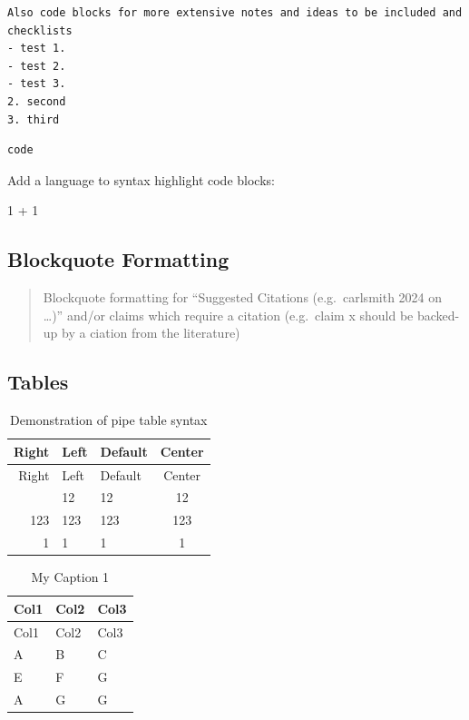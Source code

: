 \documentclass[
  11pt,
  letterpaper,
]{book}
\newenvironment{Shaded}{\begin{snugshade}}{\end{snugshade}}
\newcommand{\DecValTok}[1]{\textcolor[rgb]{0.68,0.00,0.00}{#1}}
\newcommand{\OperatorTok}[1]{\textcolor[rgb]{0.37,0.37,0.37}{#1}}
\begin{document}
\begin{verbatim}
Also code blocks for more extensive notes and ideas to be included and checklists
- test 1. 
- test 2. 
- test 3.
2. second
3. third
\end{verbatim}

\begin{verbatim}
code
\end{verbatim}

Add a language to syntax highlight code blocks:

\begin{Shaded}
\begin{Highlighting}[]
\DecValTok{1} \OperatorTok{+} \DecValTok{1}
\end{Highlighting}
\end{Shaded}

\subsection*{Blockquote Formatting}\label{blockquote-formatting}

\begin{quote}
Blockquote formatting for ``Suggested Citations (e.g.~carlsmith 2024 on
\ldots)'' and/or claims which require a citation (e.g.~claim x should be
backed-up by a ciation from the literature)
\end{quote}

\subsection*{Tables}\label{tables}

\begin{longtable}[]{@{}rllc@{}}
\caption{Demonstration of pipe table
syntax}\label{tbl-letters}\tabularnewline
\toprule\noalign{}
Right & Left & Default & Center \\
\midrule\noalign{}
\endfirsthead
\toprule\noalign{}
Right & Left & Default & Center \\
\midrule\noalign{}
\endhead
\bottomrule\noalign{}
\endlastfoot
12 & 12 & 12 & 12 \\
123 & 123 & 123 & 123 \\
1 & 1 & 1 & 1 \\
\end{longtable}

\begin{longtable}[]{@{}lll@{}}
\caption{My Caption 1}\label{tbl-letters}\tabularnewline
\toprule\noalign{}
Col1 & Col2 & Col3 \\
\midrule\noalign{}
\endfirsthead
\toprule\noalign{}
Col1 & Col2 & Col3 \\
\midrule\noalign{}
\endhead
\bottomrule\noalign{}
\endlastfoot
A & B & C \\
E & F & G \\
A & G & G \\
\end{longtable}
\end{document}
